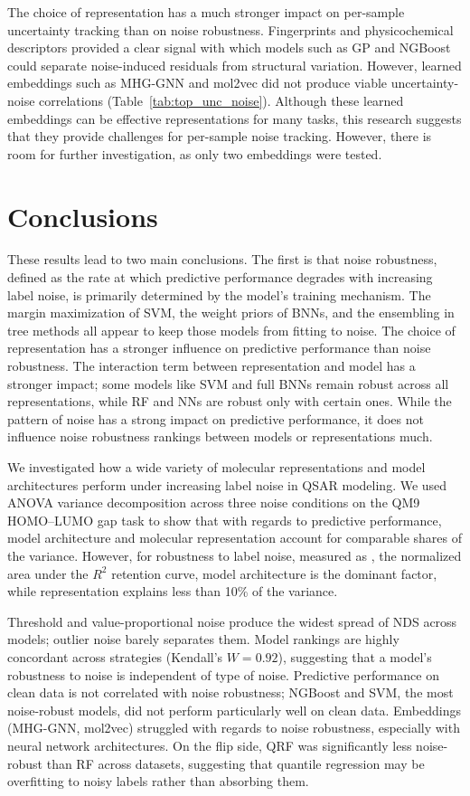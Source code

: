 The choice of representation has a much stronger impact on per-sample uncertainty tracking than on noise robustness. Fingerprints and physicochemical descriptors provided a clear signal with which models such as GP and NGBoost could separate noise-induced residuals from structural variation. However, learned embeddings such as MHG-GNN and mol2vec did not produce viable uncertainty-noise correlations (Table~\ref{tab:top_unc_noise}). Although these learned embeddings can be effective representations for many tasks, this research suggests that they provide challenges for per-sample noise tracking. However, there is room for further investigation, as only two embeddings were tested.

\section{Conclusions}

These results lead to two main conclusions. The first is that noise robustness, defined as the rate at which predictive performance degrades with increasing label noise, is primarily determined by the model's training mechanism. The margin maximization of SVM, the weight priors of BNNs, and the ensembling in tree methods all appear to keep those models from fitting to noise. The choice of representation has a stronger influence on predictive performance than noise robustness. The interaction term between representation and model has a stronger impact; some models like SVM and full BNNs remain robust across all representations, while RF and NNs are robust only with certain ones. While the pattern of noise has a strong impact on predictive performance, it does not influence noise robustness rankings between models or representations much.

We investigated how a wide variety of molecular representations and model architectures perform under increasing label noise in QSAR modeling. We used ANOVA variance decomposition across three noise conditions on the QM9 HOMO--LUMO gap task to show that with regards to predictive performance, model architecture and molecular representation account for comparable shares of the variance. However, for robustness to label noise, measured as \aucnorm, the normalized area under the $R^2$ retention curve, model architecture is the dominant factor, while representation explains less than 10\% of the variance.

Threshold and value-proportional noise produce the widest spread of NDS across models; outlier noise barely separates them. Model rankings are highly concordant across strategies (Kendall's $W = 0.92$), suggesting that a model's robustness to noise is independent of type of noise. Predictive performance on clean data is not correlated with noise robustness; NGBoost and SVM, the most noise-robust models, did not perform particularly well on clean data. Embeddings (MHG-GNN, mol2vec) struggled with regards to noise robustness, especially with neural network architectures. On the flip side, QRF was significantly less noise-robust than RF across datasets, suggesting that quantile regression may be overfitting to noisy labels rather than absorbing them.

